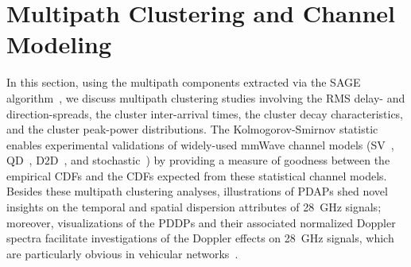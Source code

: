 \documentclass[12pt, draftcls, onecolumn]{IEEEtran}
\begin{document}
{%
\section{Multipath Clustering and Channel Modeling}\label{S5}
In this section, using the multipath components extracted via the SAGE algorithm~\cite{SAGE}, we discuss multipath clustering studies involving the RMS delay- and direction-spreads, the cluster inter-arrival times, the cluster decay characteristics, and the cluster peak-power distributions. The Kolmogorov-Smirnov statistic enables experimental validations of widely-used mmWave channel models (SV~\cite{Indoor60G}, QD~\cite{QDC_NIST}, D$2$D~\cite{NISTModeling, D2DHumanBlockage}, and stochastic~\cite{Indoor60G}) by providing a measure of goodness between the empirical CDFs and the CDFs expected from these statistical channel models. Besides these multipath clustering analyses, illustrations of PDAPs shed novel insights on the temporal and spatial dispersion attributes of \SI{28}{\giga\hertz} signals; moreover, visualizations of the PDDPs and their associated normalized Doppler spectra facilitate investigations of the Doppler effects on \SI{28}{\giga\hertz} signals, which are particularly obvious in vehicular networks~\cite{DopplerHST}.
\vspace{-3mm}

}
\end{document}
